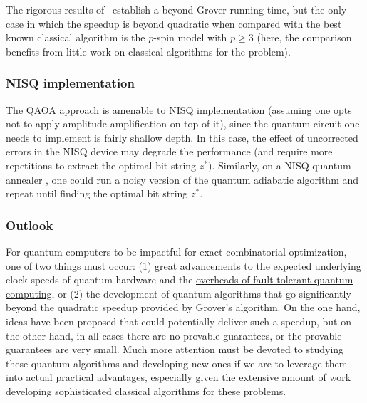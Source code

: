 \begin{refsection}
The rigorous results of~\cite{dalzell2022mindthegap} establish a beyond-Grover running time, but the only case in which the speedup is beyond quadratic when compared with the best known classical algorithm is the $p$-spin model with $p \geq 3$ (here, the comparison benefits from little work on classical algorithms for the problem). 


\subsubsection*{NISQ implementation}

The QAOA approach is amenable to NISQ implementation (assuming one opts not to apply amplitude amplification on top of it), since the quantum circuit one needs to implement is fairly shallow depth. In this case, the effect of uncorrected errors in the NISQ device may degrade the performance (and require more repetitions to extract the optimal bit string $z^*$). Similarly, on a NISQ quantum annealer \cite{kadowaki1998Annealing, albash2018AQCreview}, one could run a noisy version of the quantum adiabatic algorithm and repeat until finding the optimal bit string $z^*$.



\subsubsection*{Outlook}

For quantum computers to be impactful for exact combinatorial optimization, one of two things must occur: (1) great advancements to the expected underlying clock speeds of quantum hardware and the \hyperref[prim:FTQC]{overheads of fault-tolerant quantum computing}, or (2) the development of quantum algorithms that go significantly beyond the quadratic speedup provided by Grover's algorithm. On the one hand, ideas have been proposed that could potentially deliver such a speedup, but on the other hand, in all cases there are no provable guarantees, or the provable guarantees are very small. Much more attention must be devoted to studying these quantum algorithms and developing new ones if we are to leverage them into actual practical advantages, especially given the extensive amount of work developing sophisticated classical algorithms for these problems.




\printbibliography[heading=secbib,segment=\therefsegment]
	
\end{refsection}